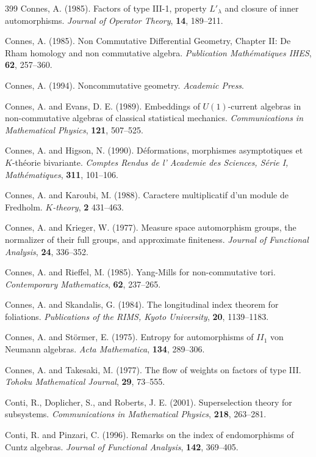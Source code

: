 \documentclass[12pt]{article}
\theoremstyle{plain}
\theoremstyle{definition}
\numberwithin{equation}{section}
\begin{document}
\begin{thebibliography} {399}
Connes, A. (1985).
Factors of type III-1, property $L'_\lambda$ and
closure of inner automorphisms.
{\em Journal of Operator Theory}, {\bf 14}, 189--211.

Connes, A. (1985).
Non Commutative Differential Geometry,
Chapter II: De Rham homology and non commutative 
algebra. {\em Publication Math\'ematiques IHES},
{\bf 62}, 257--360.

Connes, A. (1994).
Noncommutative geometry.
{\em Academic Press}.

Connes, A. and Evans, D. E. (1989).
Embeddings of $U(1)$-current algebras in 
non-commutative algebras of classical statistical
mechanics. {\em Communications in Mathematical
Physics}, {\bf 121}, 507--525.

Connes, A. and Higson, N. (1990).
D\'eformations, morphismes asymptotiques et
$K$-th\'eorie bivariante.
{\em Comptes Rendus de l' Academie des Sciences, 
S\'erie I, Math\'ematiques},
{\bf 311}, 101--106.

Connes, A. and Karoubi, M.  (1988).
Caractere multiplicatif d'un module de Fredholm.
{\em $K$-theory}, {\bf 2} 431--463.

Connes, A. and Krieger, W. (1977).
Measure space automorphism groups, the normalizer of their 
full groups, and approximate finiteness. 
{\em Journal of Functional Analysis}, {\bf 24}, 336--352.

Connes, A. and Rieffel, M. (1985).
Yang-Mills for non-commutative tori.
{\em Contemporary Mathematics},
{\bf 62}, 237--265.

Connes, A. and Skandalis, G. (1984).
The longitudinal index theorem for foliations.
{\em Publications of the  RIMS, Kyoto University},
{\bf 20}, 1139--1183.

Connes, A. and St\"ormer, E. (1975).
Entropy for automorphisms of $II_1$ von Neumann algebras.
{\em Acta Mathematica}, {\bf 134}, 289--306.

Connes, A. and Takesaki, M. (1977).
The flow of weights on factors of type III.
{\em Tohoku Mathematical Journal}, {\bf 29}, 73--555.

Conti, R., Doplicher, S., and Roberts, J. E. (2001).
Superselection theory for subsystems.
{\em Communications in Mathematical Physics},
{\bf 218}, 263--281.

Conti, R. and Pinzari, C. (1996).
Remarks on the index of endomorphisms of Cuntz algebras. 
{\em Journal of Functional Analysis}, {\bf 142},  369--405. 


\end{thebibliography}
\end{document}

